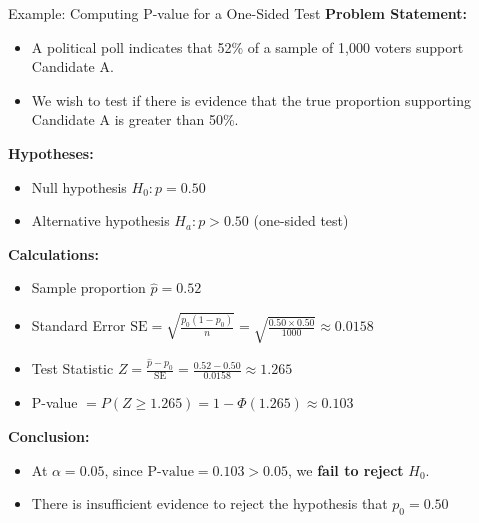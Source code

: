 \documentclass[handout]{beamer} %
\begin{document}
\begin{frame}{Example: Computing P-value for a One-Sided Test}
\footnotesize
    \textbf{Problem Statement:}
    \begin{itemize}
        \item A political poll indicates that 52\% of a sample of 1,000 voters support Candidate A.
        \item We wish to test if there is evidence that the true proportion supporting Candidate A is greater than 50\%.
    \end{itemize}

    \textbf{Hypotheses:}
    \begin{itemize}
        \item Null hypothesis \( H_0: p = 0.50 \)
        \item Alternative hypothesis \( H_a: p > 0.50 \) (one-sided test)
    \end{itemize}

    \textbf{Calculations:}
    \begin{itemize}
        \item Sample proportion \( \hat{p} = 0.52 \)
        \item Standard Error \( \text{SE} = \sqrt{\frac{p_0 (1 - p_0)}{n}} = \sqrt{\frac{0.50 \times 0.50}{1000}} \approx 0.0158 \)
        \item Test Statistic \( Z = \frac{\hat{p} - p_0}{\text{SE}} = \frac{0.52 - 0.50}{0.0158} \approx 1.265 \)
        \item P-value \( = P(Z \geq 1.265) = 1 - \Phi(1.265) \approx 0.103 \)
    \end{itemize}

    \textbf{Conclusion:}
    \begin{itemize}
        \item At \( \alpha = 0.05 \), since \( \text{P-value} = 0.103 > 0.05 \), we \textbf{fail to reject} \( H_0 \).
        \item There is insufficient evidence to reject the hypothesis that $p_0 = 0.50$
    \end{itemize}
\end{frame}
\end{document}
